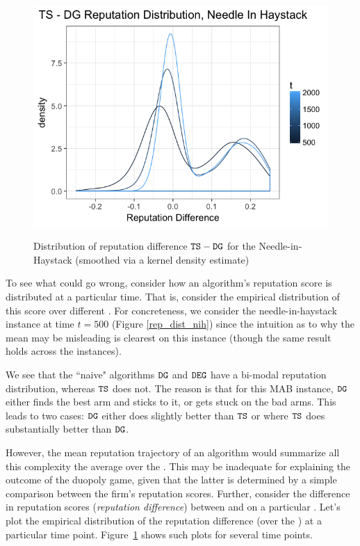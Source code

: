 \documentclass[../competing_bandits.tex]{subfiles}
\begin{document}
\begin{figure}[ht]
\caption{Distribution of reputation difference $\mathtt{TS}-\mathtt{DG}$ for the Needle-in-Haystack (smoothed via a kernel density estimate)}
\includegraphics[scale=0.35]{figures/ts_dg_rep_diff_nih}
\label{ts_dg_rep_diff_nih}
\end{figure}

To see what could go wrong, consider how an algorithm's reputation score is distributed at a particular time. That is, consider the empirical distribution of this score over different \MRVs. For concreteness, we consider the needle-in-haystack instance at time $t=500$ (Figure \ref{rep_dist_nih}) since the intuition as to why the mean may be misleading is clearest on this instance (though the same result holds across the instances).

We see that the ``naive" algorithms $\mathtt{DG}$ and $\mathtt{DEG}$ have a bi-modal reputation distribution, whereas $\mathtt{TS}$ does not. The reason is that for this MAB instance, $\mathtt{DG}$ either finds the best arm and sticks to it, or gets stuck on the bad arms. This leads to two cases: $\mathtt{DG}$ either does slightly better than $\mathtt{TS}$ or where $\mathtt{TS}$ does substantially better than $\mathtt{DG}$.

However, the mean reputation trajectory of an algorithm would summarize all this complexity the average over the \MRVs. This may be inadequate for explaining the outcome of the duopoly game, given that the latter is determined by a simple comparison between the firm's reputation scores. Further, consider the difference in reputation scores (\emph{reputation difference}) between \TS and \DG on a particular \MRV. Let's plot the empirical distribution of the reputation difference (over the \MRVs) at a particular time point. Figure~\ref{ts_dg_rep_diff_nih} shows such plots for several time points.
\end{document}
